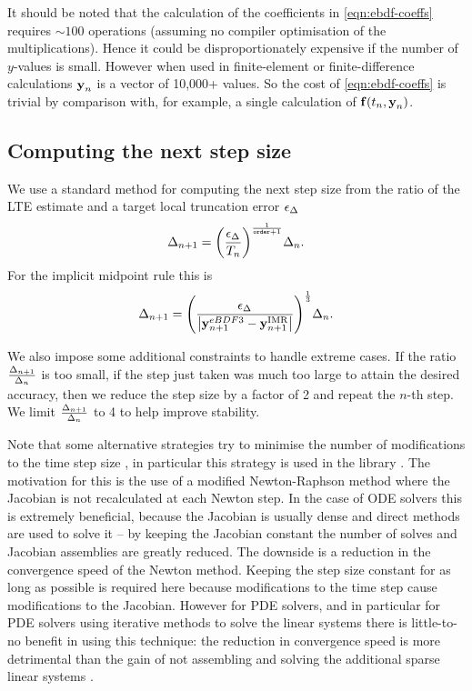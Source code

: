 It should be noted that the calculation of the coefficients in \cref{eqn:ebdf-coeffs} requires $\sim 100$ operations (assuming no compiler optimisation of the multiplications).
Hence it could be disproportionately expensive if the number of $y$-values is small.
However when used in finite-element or finite-difference calculations $\boldsymbol{\mathrm{y}}_n$ is a vector of 10,000+ values.
So the cost of \cref{eqn:ebdf-coeffs} is trivial by comparison with, for example, a single calculation of ${\boldsymbol{\mathrm{f}}{\left( t_n, \boldsymbol{\mathrm{y}}_n \right)}}$.


\subsection{Computing the next step size}
\label{sec:computing-next-step}

We use a standard method \cite[268]{GreshoSani} for computing the next step size from the ratio of the LTE estimate and a target local truncation error $\epsilon_{\Delta_{}}$
\begin{equation}
  \Delta_{n+1} = {\left(  \frac{\epsilon_{\Delta_{}}}{T_n}  \right)}^{\frac{1}{\texttt{order}+1}} \Delta_{n} .
\end{equation}
For the implicit midpoint rule this is
\begin{equation}
  \Delta_{n+1} = {\left(  \frac{\epsilon_{\Delta_{}}}{\left|{\boldsymbol{\mathrm{y}}_{n+1}^{eBDF3} - \boldsymbol{\mathrm{y}}_{n+1}^{\mathrm{IMR}}} \right|}  \right)}^{\frac{1}{3}}  \Delta_{n}.
  \label{eq:next-step-dt}
\end{equation}

We also impose some additional constraints to handle extreme cases.
If the ratio $\frac{\Delta_{n+1}}{\Delta_{n}}$ is too small, \ie if the step just taken was much too large to attain the desired accuracy, then we reduce the step size by a factor of 2 and repeat the $n$-th step.
We limit $\frac{\Delta_{n+1}}{\Delta_{n}}$ to 4 to help improve stability.

Note that some alternative strategies try to minimise the number of modifications to the time step size \cite[Chap. 6]{Iserles2009}, in particular this strategy is used in the \cvode library \cite[Sec. 2.1]{cvode-manual}.
The motivation for this is the use of a modified Newton-Raphson method where the Jacobian is not recalculated at each Newton step.
In the case of ODE solvers this is extremely beneficial, because the Jacobian is usually dense and direct methods are used to solve it -- by keeping the Jacobian constant the number of solves and Jacobian assemblies are greatly reduced.
The downside is a reduction in the convergence speed of the Newton method.
Keeping the step size constant for as long as possible is required here because modifications to the time step cause modifications to the Jacobian.
However for PDE solvers, and in particular for PDE solvers using iterative methods to solve the linear systems there is little-to-no benefit in using this technique: the reduction in convergence speed is more detrimental than the gain of not assembling and solving the additional sparse linear systems \cite[128]{Iserles2009}.


